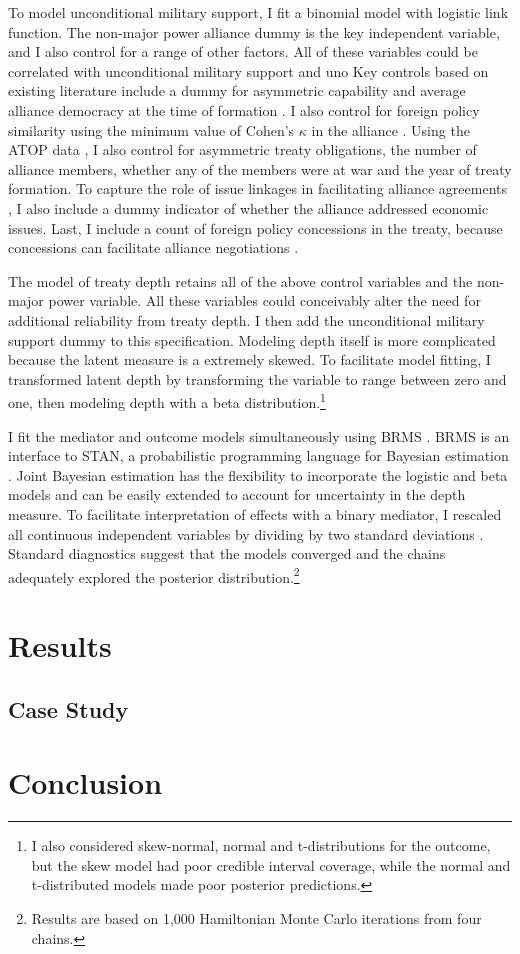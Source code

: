 \documentclass[12pt]{article}
\begin{document}
To model unconditional military support, I fit a binomial model with logistic link function. 
The non-major power alliance dummy is the key independent variable, and I also control for a range of other factors.
All of these variables could be correlated with unconditional military support and uno
Key controls based on existing literature include a dummy for asymmetric capability \citep{Mattes2012} and average alliance democracy at the time of formation \citep{Chibaetal2015}. 
I also control for foreign policy similarity \citep{Benson2012} using the minimum value of Cohen's $\kappa$ in the alliance \citep{Hage2011}.
Using the ATOP data \citep{Leedsetal2002}, I also control for asymmetric treaty obligations, the number of alliance members, whether any of the members were at war and the year of treaty formation. 
To capture the role of issue linkages in facilitating alliance agreements \citep{Poast2012, Poast2013}, I also include a dummy indicator of whether the alliance addressed economic issues.  
Last, I include a count of foreign policy concessions in the treaty, because concessions can facilitate alliance negotiations \citep{Johnson2015}. 


The model of treaty depth retains all of the above control variables and the non-major power variable. 
All these variables could conceivably alter the need for additional reliability from treaty depth. 
I then add the unconditional military support dummy to this specification. 
Modeling depth itself is more complicated because the latent measure is a extremely skewed.
To facilitate model fitting, I transformed latent depth by transforming the variable to range between zero and one, then modeling depth with a beta distribution.\footnote{I also considered skew-normal, normal and t-distributions for the outcome, but the skew model had poor credible interval coverage, while the normal and t-distributed models made poor posterior predictions.}


I fit the mediator and outcome models simultaneously using BRMS \citep{Buerkner2017}. 
BRMS is an interface to STAN, a probabilistic programming language for Bayesian estimation \citep{Carpenteretal2016}.
Joint Bayesian estimation has the flexibility to incorporate the logistic and beta models and can be easily extended to account for uncertainty in the depth measure. 
To facilitate interpretation of effects with a binary mediator, I rescaled all continuous independent variables by dividing by two standard deviations \citep{Gelman2008}. 
Standard diagnostics suggest that the models converged and the chains adequately explored the posterior distribution.\footnote{Results are based on 1,000 Hamiltonian Monte Carlo iterations from four chains.} 


\section{Results}



\subsection{Case Study}


\section{Conclusion}




\singlespace
 
 
\end{document}
